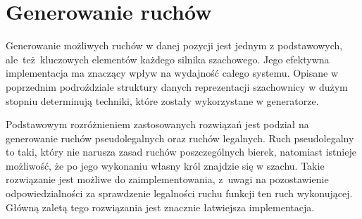 \section{Generowanie ruchów}
\label{sec:generowanie-ruchow}

Generowanie możliwych ruchów w danej pozycji jest jednym z podstawowych, ale~też~kluczowych elementów każdego silnika szachowego.
Jego efektywna implementacja ma znaczący wpływ na wydajność całego systemu.
Opisane w poprzednim podroździale struktury danych reprezentacji szachownicy w dużym stopniu determinują techniki, które zostały wykorzystane w generatorze.

Podstawowym rozróżnieniem zastosowanych rozwiązań jest podział na generowanie ruchów pseudolegalnych oraz ruchów legalnych.
Ruch pseudolegalny to taki, który nie narusza zasad ruchów poszczególnych bierek, natomiast istnieje możliwość, że po jego wykonaniu własny król znajdzie się w szachu.
Takie rozwiązanie jest możliwe do zaimplementowania, z~uwagi na pozostawienie odpowiedzialności za sprawdzenie legalności ruchu funkcji ten ruch wykonującej.
Główną zaletą tego rozwiązania jest znacznie łatwiejsza implementacja.



